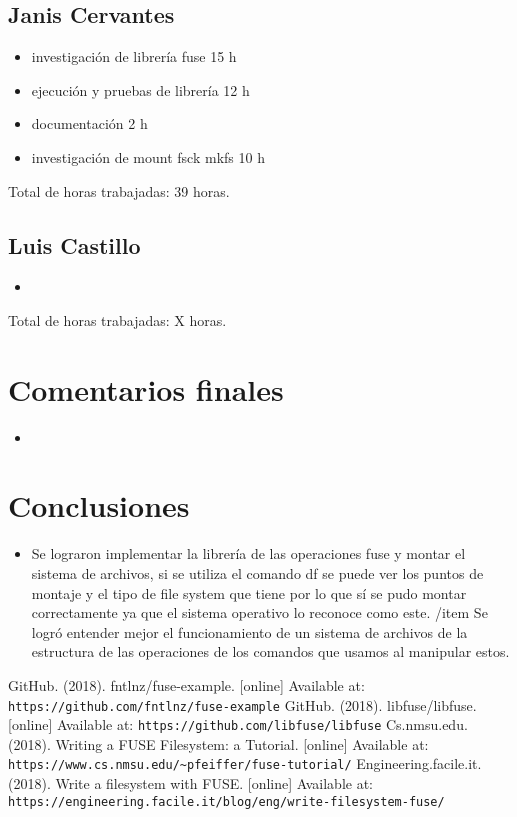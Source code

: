 \documentclass{article}
\begin{document}
\subsection{Janis Cervantes}
\begin{itemize}
  \item investigación de librería fuse 15 h
  \item ejecución y pruebas de librería 12 h
  \item documentación 2 h
  \item investigación de mount fsck mkfs 10 h
\end{itemize}
Total de horas trabajadas: 39 horas.

\subsection{Luis Castillo}
\begin{itemize}
  \item
\end{itemize}
Total de horas trabajadas: X horas.

\section{Comentarios finales}
\begin{itemize}
  \item 
\end{itemize}

\section{Conclusiones}
\begin{itemize}
  \item Se lograron implementar la librería de las operaciones fuse y montar el sistema de archivos, si se utiliza el comando df se puede ver los puntos de montaje y el tipo de file system que tiene por lo que sí se pudo montar correctamente ya que el sistema operativo lo reconoce como este. 
  /item Se logró entender mejor el funcionamiento de un sistema de archivos de la estructura de las operaciones de los comandos que usamos al manipular estos. 
\end{itemize}

\begin{thebibliography}{99}
   GitHub. (2018). fntlnz/fuse-example. [online] Available at: \texttt{https://github.com/fntlnz/fuse-example}
   GitHub. (2018). libfuse/libfuse. [online] Available at: \texttt{https://github.com/libfuse/libfuse}
   Cs.nmsu.edu. (2018). Writing a FUSE Filesystem: a Tutorial. [online] Available at: \texttt{https://www.cs.nmsu.edu/\~{}pfeiffer/fuse-tutorial/}
   Engineering.facile.it. (2018). Write a filesystem with FUSE. [online] Available at: \texttt{https://engineering.facile.it/blog/eng/write-filesystem-fuse/}
\end{thebibliography}
\end{document}
